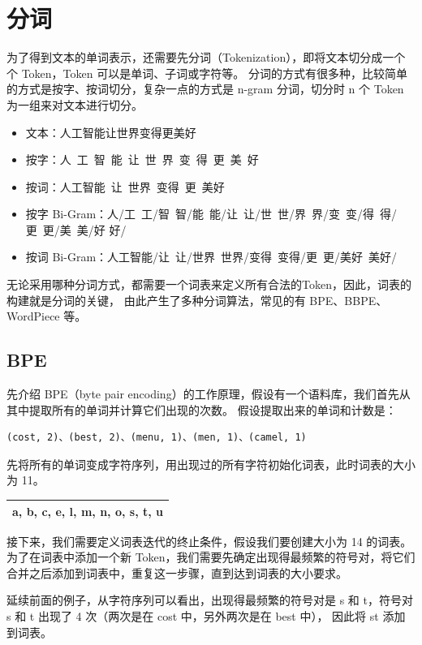 \section{分词}
为了得到文本的单词表示，还需要先分词（Tokenization），即将文本切分成一个个 Token，Token 可以是单词、子词或字符等。
分词的方式有很多种，比较简单的方式是按字、按词切分，复杂一点的方式是 n-gram 分词，切分时 n 个 Token 为一组来对文本进行切分。
\begin{itemize}
	\item 文本：人工智能让世界变得更美好
	\item 按字：人~工~智~能~让~世~界~变~得~更~美~好
	\item 按词：人工智能~让~世界~变得~更~美好
	\item 按字 Bi-Gram：人/工~工/智~智/能~能/让~让/世~世/界~界/变~变/得~得/更~更/美~美/好 好/
	\item 按词 Bi-Gram：人工智能/让~让/世界~世界/变得~变得/更~更/美好~美好/
\end{itemize}

无论采用哪种分词方式，都需要一个词表来定义所有合法的Token，因此，词表的构建就是分词的关键，
由此产生了多种分词算法，常见的有 BPE、BBPE、WordPiece 等。

\subsection{BPE}
先介绍 BPE（byte pair encoding）的工作原理，假设有一个语料库，我们首先从其中提取所有的单词并计算它们出现的次数。
假设提取出来的单词和计数是：

\begin{verbatim}
(cost, 2)、(best, 2)、(menu, 1)、(men, 1)、(camel, 1)
\end{verbatim}

先将所有的单词变成字符序列，用出现过的所有字符初始化词表，此时词表的大小为 11。

\begin{table}[H]
	\centering
	\begin{tabular}{|l|}
		\hline
		a, b, c, e, l, m, n, o, s, t, u \\
		\hline
	\end{tabular}
\end{table}

接下来，我们需要定义词表迭代的终止条件，假设我们要创建大小为 14 的词表。
为了在词表中添加一个新 Token，我们需要先确定出现得最频繁的符号对，将它们合并之后添加到词表中，重复这一步骤，直到达到词表的大小要求。

延续前面的例子，从字符序列可以看出，出现得最频繁的符号对是 s 和 t，符号对 s 和 t 出现了 4 次（两次是在 cost 中，另外两次是在 best 中），
因此将 st 添加到词表。

